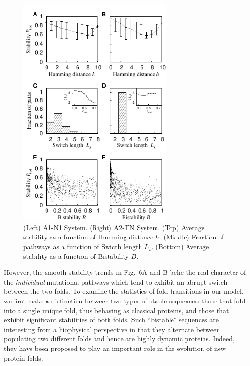 \documentclass[
aip,
rsi,%
amsmath,amssymb,
reprint,%
]{revtex4-1}
\begin{document}
\begin{figure}
\includegraphics[width=7.8cm]{Paths}
\caption{(Left) A1-N1 System. (Right) A2-TN System. (Top) Average stability as a function of Hamming distance $h$. (Middle) Fraction of pathways as a function of Swicth length $L_s$. (Bottom) Average stability as a function of Bistability $B$.}
\end{figure}


However, the smooth stability trends in Fig.~6A and B belie the real character of the \textit{individual} mutational pathways which tend to exhibit an abrupt switch between the two folds. To examine the statistics of fold transitions in our model, we first make a distinction between two types of stable sequences: those that fold into a single unique fold, thus behaving as classical proteins, and those that exhibit significant stabilities of both folds. Such ``bistable" sequences are interesting from a biophysical perspective in that they alternate between populating two different folds and hence are highly dynamic proteins. Indeed, they have been proposed to play an important role in the evolution of new protein folds.~\cite{Sikosek2016} 
\end{document}
